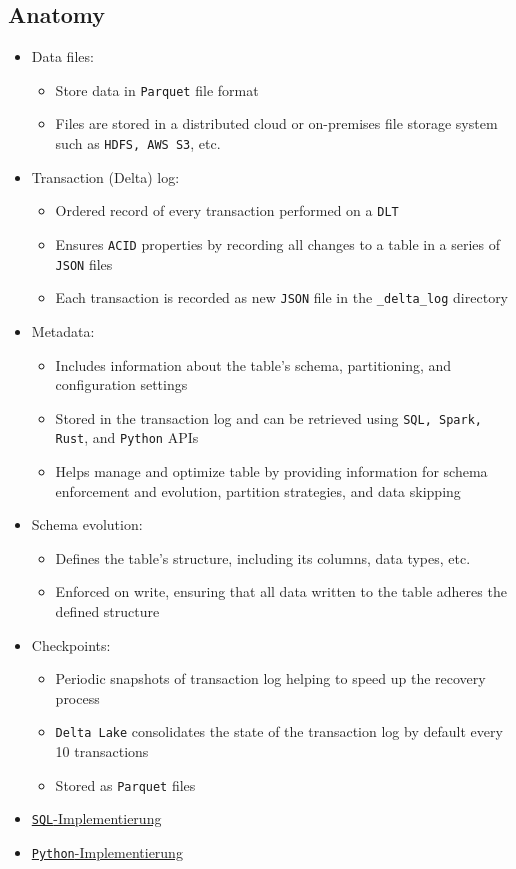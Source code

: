 \documentclass[11pt]{scrartcl}
\begin{document}
\subsection{Anatomy}
\begin{itemize}
	\item Data files:
	\begin{itemize}
		\item Store data in \texttt{Parquet} file format
		\item Files are stored in a distributed cloud or on-premises file storage system such as \texttt{HDFS, AWS S3}, etc.
	\end{itemize}
	\item Transaction (Delta) log:
	\begin{itemize}
		\item Ordered record of every transaction performed on a \texttt{DLT}
		\item Ensures \texttt{ACID} properties by recording all changes to a table in a series of \texttt{JSON} files
		\item Each transaction is recorded as new \texttt{JSON} file in the \texttt{\_delta\_log} directory
	\end{itemize}
	\item Metadata:
	\begin{itemize}
		\item Includes information about the table's schema, partitioning, and configuration settings
		\item Stored in the transaction log and can be retrieved using \texttt{SQL, Spark, Rust}, and \texttt{Python} APIs
		\item Helps manage and optimize table by providing information for schema enforcement and evolution, partition strategies, and data skipping
	\end{itemize}
	\item Schema evolution:
	\begin{itemize}
		\item Defines the table's structure, including its columns, data types, etc.
		\item Enforced on write, ensuring that all data written to the table adheres the defined structure
	\end{itemize}
	\item Checkpoints:
	\begin{itemize}
		\item Periodic snapshots of transaction log helping to speed up the recovery process
		\item \texttt{Delta Lake} consolidates the state of the transaction log by default every 10 transactions
		\item Stored as \texttt{Parquet} files 
	\end{itemize}
	\item \hyperref[delta_table_sql]{\texttt{SQL}-Implementierung}
	\item \hyperref[delta_table_python]{\texttt{Python}-Implementierung}
\end{itemize}
\end{document}
